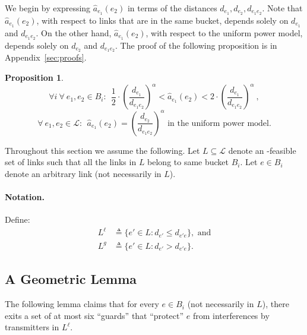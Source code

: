 \documentclass[11pt]{article}
\newenvironment{proof sketch}{\noindent {\bf Proof sketch:} }{\hfill \qed}
\newtheorem{proposition}{Proposition}
\newcommand{\sinr}{\text{\sc{sinr}}}
\newcommand{\LL}{\mathcal{L}}
\newcommand{\eqdf}{\triangleq}
\begin{document}
We begin by expressing $\hat a_{e_1}(e_2)$ in terms of the distances $d_{e_1}, d_{e_2}, d_{e_1e_2}$.
Note that $\hat a_{e_1}(e_2)$, with respect to links that are in the same bucket, depends solely on
$d_{e_1}$ and $d_{e_1e_2}$. On the other hand, $\hat a_{e_1}(e_2)$, with respect to the uniform power model, depends solely on $d_{e_2}$ and $d_{e_1e_2}$. The proof of the following proposition is in Appendix~\ref{sec:proofs}.
\begin{proposition}\label{prop:aff}
$$\forall i ~\forall ~e_1,e_2 \in B_i:~~  \frac 12 \cdot \left(\frac{d_{e_1}}{d_{e_1
          e_2}}\right)^\alpha < \hat a_{e_1}(e_2)  <2 \cdot \left(\frac{d_{e_1}}{d_{e_1
          e_2}}\right)^\alpha \:,$$
    $$\forall ~e_1,e_2 \in \LL:~~ \hat a_{e_1}(e_2) = \left(\frac{d_{e_2}}{d_{e_1
          e_2}}\right)^\alpha \text{ in the uniform power model.}$$
\end{proposition}



Throughout this section we assume the following.
Let $L \subseteq \LL$ denote an \sinr-feasible set of links such that all the links in $L$
belong to same bucket $B_i$.
Let $e\in B_i$ denote an arbitrary link (not
necessarily in $L$).
\paragraph{Notation.}
Define:
\begin{align*}
  L^{\ell} & \eqdf  \{e' \in L : d_{e'} \leq  d_{e'e}\}, \text{ and}\\
  L^g & \eqdf  \{e' \in L : d_{e'} > d_{e'e}\}.
\end{align*}
\medskip

\subsection{A Geometric Lemma}
The following lemma claims that for every $e \in  B_i$ (not necessarily in $L$), there exits a set of
at most six ``guards'' that ``protect'' $e$ from interferences by transmitters in
$L^{\ell}$.
\end{document}
